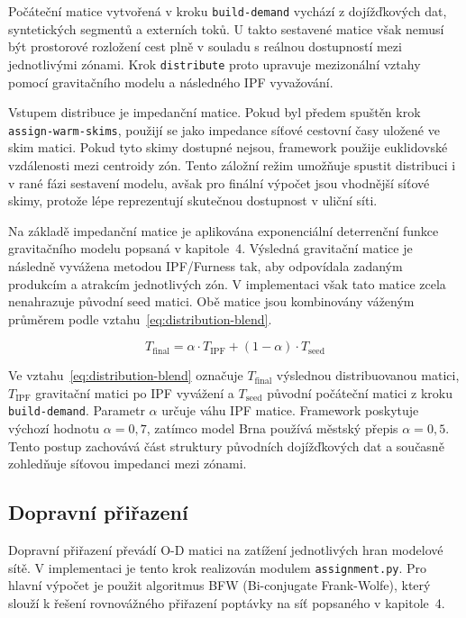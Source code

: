 Počáteční matice vytvořená v kroku \texttt{build-demand} vychází z dojížďkových dat, syntetických segmentů a externích toků. U takto sestavené matice však nemusí být prostorové rozložení cest plně v souladu s reálnou dostupností mezi jednotlivými zónami. Krok \texttt{distribute} proto upravuje mezizonální vztahy pomocí gravitačního modelu a následného IPF vyvažování.

Vstupem distribuce je impedanční matice. Pokud byl předem spuštěn krok \texttt{assign-warm-skims}, použijí se jako impedance síťové cestovní časy uložené ve skim matici. Pokud tyto skimy dostupné nejsou, framework použije euklidovské vzdálenosti mezi centroidy zón. Tento záložní režim umožňuje spustit distribuci i v rané fázi sestavení modelu, avšak pro finální výpočet jsou vhodnější síťové skimy, protože lépe reprezentují skutečnou dostupnost v uliční síti.

Na základě impedanční matice je aplikována exponenciální deterrenční funkce gravitačního modelu popsaná v kapitole~4. Výsledná gravitační matice je následně vyvážena metodou IPF/Furness tak, aby odpovídala zadaným produkcím a atrakcím jednotlivých zón. V implementaci však tato matice zcela nenahrazuje původní seed matici. Obě matice jsou kombinovány váženým průměrem podle vztahu~\ref{eq:distribution-blend}.

\begin{equation}
T_{\mathrm{final}} = \alpha \cdot T_{\mathrm{IPF}} + (1 - \alpha) \cdot T_{\mathrm{seed}}
\label{eq:distribution-blend}
\end{equation}

Ve vztahu~\ref{eq:distribution-blend} označuje $T_{\mathrm{final}}$ výslednou distribuovanou matici, $T_{\mathrm{IPF}}$ gravitační matici po IPF vyvážení a $T_{\mathrm{seed}}$ původní počáteční matici z kroku \texttt{build-demand}. Parametr $\alpha$ určuje váhu IPF matice. Framework poskytuje výchozí hodnotu $\alpha = 0{,}7$, zatímco model Brna používá městský přepis $\alpha = 0{,}5$. Tento postup zachovává část struktury původních dojížďkových dat a současně zohledňuje síťovou impedanci mezi zónami.

\subsection{Dopravní přiřazení}
\label{sec:impl-calibration-assignment}

Dopravní přiřazení převádí O-D matici na zatížení jednotlivých hran modelové sítě. V implementaci je tento krok realizován modulem \texttt{assignment.py}. Pro hlavní výpočet je použit algoritmus BFW (Bi-conjugate Frank-Wolfe), který slouží k řešení rovnovážného přiřazení poptávky na síť popsaného v kapitole~4.

